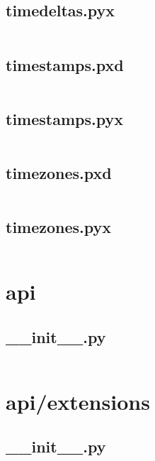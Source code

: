 \documentclass{article}
\begin{document}
\subsection{timedeltas.pyx}
\inputminted{cython}{/home/dufferzafar/dev/@clones/pandas/pandas/_libs/tslibs/timedeltas.pyx}
\newpage

\subsection{timestamps.pxd}
\inputminted{cython}{/home/dufferzafar/dev/@clones/pandas/pandas/_libs/tslibs/timestamps.pxd}
\newpage

\subsection{timestamps.pyx}
\inputminted{cython}{/home/dufferzafar/dev/@clones/pandas/pandas/_libs/tslibs/timestamps.pyx}
\newpage

\subsection{timezones.pxd}
\inputminted{cython}{/home/dufferzafar/dev/@clones/pandas/pandas/_libs/tslibs/timezones.pxd}
\newpage

\subsection{timezones.pyx}
\inputminted{cython}{/home/dufferzafar/dev/@clones/pandas/pandas/_libs/tslibs/timezones.pyx}
\newpage

\section{api}

\subsection{\_\_init\_\_.py}
\inputminted{python}{/home/dufferzafar/dev/@clones/pandas/pandas/api/__init__.py}
\newpage

\section{api/extensions}

\subsection{\_\_init\_\_.py}
\inputminted{python}{/home/dufferzafar/dev/@clones/pandas/pandas/api/extensions/__init__.py}
\newpage
\end{document}
